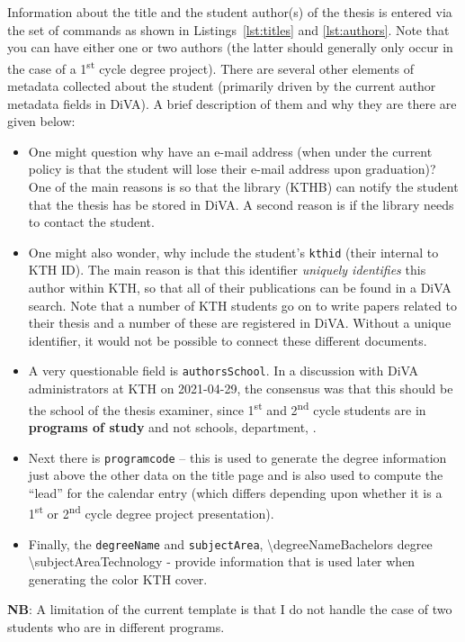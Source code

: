 Information about the title and the student author(s) of the thesis is entered via the set of commands as shown in Listings~\ref{lst:titles} and \ref{lst:authors}. Note that you can have either one or two authors (the latter should generally only occur in the case of a 1\textsuperscript{st} cycle degree project). There are several other elements of metadata collected about the student (primarily driven by the current author metadata fields in DiVA). A brief description of them and why they are there are given below:
\begin{itemize}
    \item One might question why have an e-mail address (when under the current policy is that the student will lose their e-mail address upon graduation)? One of the main reasons is so that the library (\ie KTHB) can notify the student that the thesis has be stored in DiVA. A second reason is if the library needs to contact the student.
    
    \item One might also wonder, why include the student’s \texttt{kthid} (\ie their internal to KTH ID). The main reason is that this identifier \textit{uniquely identifies} this author within KTH, so that all of their publications can be found in a DiVA search. Note that a number of KTH students go on to write papers related to their thesis and a number of these are registered in DiVA. Without a unique identifier, it would not be possible to connect these different documents.
    
    \item A very questionable field is \texttt{authorsSchool}. In a discussion with DiVA administrators at KTH on 2021-04-29, the consensus was that this should be the school of the thesis examiner, since 1\textsuperscript{st} and 2\textsuperscript{nd} cycle students are in \textbf{programs of study} and not schools, department, \etc.
    
    \item Next there is \texttt{programcode} – this is used to generate the degree information just above the other data on the title page and is also used to compute the “lead” for the calendar entry (which differs depending upon whether it is a 1\textsuperscript{st} or 2\textsuperscript{nd} cycle degree project presentation).
    
    \item Finally, the \texttt{degreeName} and \texttt{subjectArea}, \eg \textbackslash degreeName{Bachelors degree} \textbackslash subjectArea{Technology }- provide information that is used later when generating the color KTH cover.
\end{itemize}
\textbf{NB}: A limitation of the current template is that I do not handle the case of two students who are in different programs.

